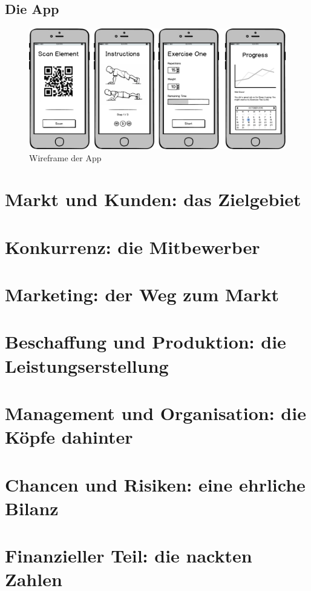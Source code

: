 \subsection{Die App}
\begin{figure}[h]
\centering
\includegraphics[width=0.5\linewidth]{images/app}
\caption{Wireframe der App}
\label{fig:app}
\end{figure}


\section{Markt und Kunden: das Zielgebiet}

\section{Konkurrenz: die Mitbewerber}

\section{Marketing: der Weg zum Markt}

\section{Beschaffung und Produktion: die Leistungserstellung}

\section{Management und Organisation: die Köpfe dahinter}

\section{Chancen und Risiken: eine ehrliche Bilanz}

\section{Finanzieller Teil: die nackten Zahlen}


